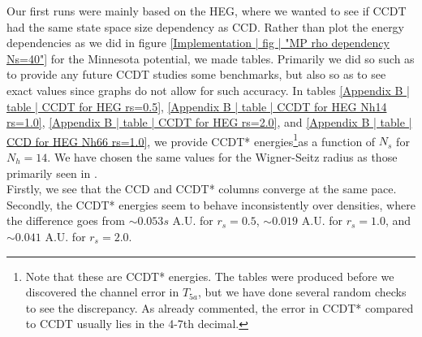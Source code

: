 \documentclass[10pt,twoside]{report}
\begin{document}
	Our first runs were mainly based on the HEG, where we wanted to see if CCDT had the same state space size dependency as CCD. Rather than plot the energy dependencies as we did in figure \ref{Implementation | fig | "MP rho dependency Ns=40"} for the Minnesota potential, we made tables. Primarily we did so such as to provide any future CCDT studies some benchmarks, but also so as to see exact values since graphs do not allow for such accuracy. In tables \ref{Appendix B | table | CCDT for HEG rs=0.5}, \ref{Appendix B | table | CCDT for HEG Nh14 rs=1.0}, \ref{Appendix B | table | CCDT for HEG rs=2.0}, and \ref{Appendix B | table | CCD for HEG Nh66 rs=1.0}, we provide CCDT* energies\footnote{Note that these are CCDT* energies. The tables were produced before we discovered the channel error in $T_{5a}$, but we have done several random checks to see the discrepancy. As already commented, the error in CCDT* compared to CCDT usually lies in the 4-7th decimal.}as a function of $N_s$ for $N_h=14$. We have chosen the same values for the Wigner-Seitz radius as those primarily seen in \cite{Hansen15}.\\
	
	Firstly, we see that the CCD and CCDT* columns converge at the same pace. Secondly, the CCDT* energies seem to behave inconsistently over densities, where the difference goes from $\sim 0.053s$ A.U. for $r_s=0.5$, $\sim 0.019$ A.U. for $r_s=1.0$, and $\sim 0.041$ A.U. for $r_s=2.0$.\\
	
\end{document}
